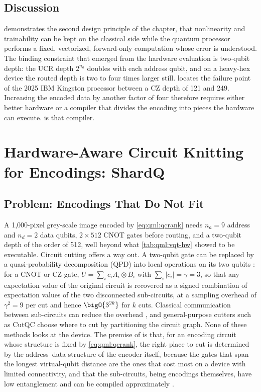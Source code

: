 \subsection{Discussion}\label{sec:qml:vqt:discussion}

\vqt{} demonstrates the second design principle of the chapter, that nonlinearity and trainability can be kept on the classical side while the quantum processor performs a fixed, vectorized, forward-only computation whose error is understood. The binding constraint that emerged from the hardware evaluation is two-qubit depth: the UCR depth $2^{n_a}$ doubles with each address qubit, and on a heavy-hex device the routed depth is two to four times larger still.  locates the failure point of the 2025 IBM Kingston processor between a CZ depth of 121 and 249. Increasing the encoded data by another factor of four therefore requires either better hardware or a compiler that divides the encoding into pieces the hardware can execute. \shardq{} is that compiler.

\section{Hardware-Aware Circuit Knitting for Encodings: ShardQ}\label{sec:qml:shardq}

\subsection{Problem: Encodings That Do Not Fit}\label{sec:qml:shardq:problem}

A 1,000-pixel grey-scale image encoded by \cref{eq:qml:qcrank} needs $n_a = 9$ address and $n_d = 2$ data qubits, $2 \times 512$ CNOT gates before routing, and a two-qubit depth of the order of 512, well beyond what \cref{tab:qml:vqt-hw} showed to be executable. Circuit cutting offers a way out. A two-qubit gate can be replaced by a quasi-probability decomposition (QPD) into local operations on its two qubits \cite{mitarai2021virtualgate,peng2020circuitcutting,bravyi2016trading}: for a CNOT or CZ gate, $U = \sum_i c_i A_i \otimes B_i$ with $\sum_i |c_i| = \gamma = 3$, so that any expectation value of the original circuit is recovered as a signed combination of expectation values of the two disconnected sub-circuits, at a sampling overhead of $\gamma^2 = 9$ per cut and hence $\bigO{3^{2k}}$ for $k$ cuts. Classical communication between sub-circuits can reduce the overhead \cite{piveteau2024knitting}, and general-purpose cutters such as CutQC \cite{tang2021cutqc} choose where to cut by partitioning the circuit graph. None of these methods looks at the device. The premise of \shardq{} is that, for an encoding circuit whose structure is fixed by \cref{eq:qml:qcrank}, the right place to cut is determined by the address--data structure of the encoder itself, because the gates that span the longest virtual-qubit distance are the ones that cost most on a device with limited connectivity, and that the sub-circuits, being encodings themselves, have low entanglement and can be compiled approximately \cite{guo2025shardq}.

